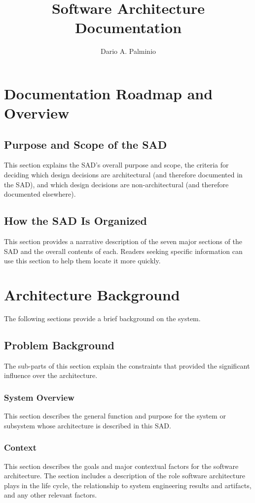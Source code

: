 \documentclass[a4paper,11pt]{book}
\title{Software Architecture Documentation}
\author{Dario A. Palminio}
\begin{document}
\maketitle

\tableofcontents

\chapter{Documentation Roadmap and Overview}

\section{Purpose and Scope of the SAD}
This section explains the SAD’s overall purpose and scope, the criteria for deciding which design decisions are architectural (and therefore documented in the SAD), and which design decisions are non-architectural (and therefore documented elsewhere).

\section{How the SAD Is Organized}
This section provides a narrative description of the seven major sections of the SAD and the overall contents of each. Readers seeking specific information can use this section to help them locate it more quickly.

\chapter{Architecture Background}
The following sections provide a brief background on the system.

\section{Problem Background}
The sub-parts of this section explain the constraints that provided the significant influence over the architecture.

\subsection{System Overview}
This section describes the general function and purpose for the system or subsystem whose architecture is described in this SAD.

\subsection{Context}
This section describes the goals and major contextual factors for the software architecture. The section includes a description of the role software architecture plays in the life cycle, the relationship to system engineering results and artifacts, and any other relevant factors.
\end{document}
